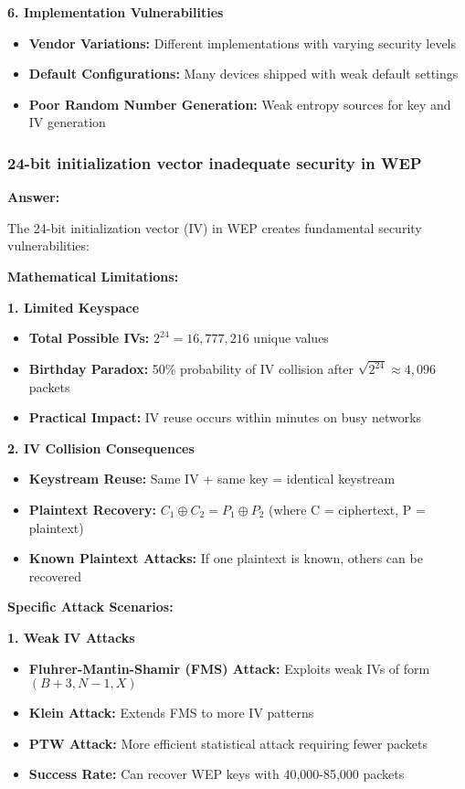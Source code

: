 \documentclass[12pt,a4paper]{article}
\begin{document}
\textbf{6. Implementation Vulnerabilities}
\begin{itemize}
    \item \textbf{Vendor Variations:} Different implementations with varying security levels
    \item \textbf{Default Configurations:} Many devices shipped with weak default settings
    \item \textbf{Poor Random Number Generation:} Weak entropy sources for key and IV generation
\end{itemize}

\subsubsection{24-bit initialization vector inadequate security in WEP}

\textbf{Answer:}

The 24-bit initialization vector (IV) in WEP creates fundamental security vulnerabilities:

\textbf{Mathematical Limitations:}

\textbf{1. Limited Keyspace}
\begin{itemize}
    \item \textbf{Total Possible IVs:} $2^{24} = 16,777,216$ unique values
    \item \textbf{Birthday Paradox:} 50\% probability of IV collision after $\sqrt{2^{24}} \approx 4,096$ packets
    \item \textbf{Practical Impact:} IV reuse occurs within minutes on busy networks
\end{itemize}

\textbf{2. IV Collision Consequences}
\begin{itemize}
    \item \textbf{Keystream Reuse:} Same IV + same key = identical keystream
    \item \textbf{Plaintext Recovery:} $C_1 \oplus C_2 = P_1 \oplus P_2$ (where C = ciphertext, P = plaintext)
    \item \textbf{Known Plaintext Attacks:} If one plaintext is known, others can be recovered
\end{itemize}

\textbf{Specific Attack Scenarios:}

\textbf{1. Weak IV Attacks}
\begin{itemize}
    \item \textbf{Fluhrer-Mantin-Shamir (FMS) Attack:} Exploits weak IVs of form $(B+3, N-1, X)$
    \item \textbf{Klein Attack:} Extends FMS to more IV patterns
    \item \textbf{PTW Attack:} More efficient statistical attack requiring fewer packets
    \item \textbf{Success Rate:} Can recover WEP keys with 40,000-85,000 packets
\end{itemize}
\end{document}
